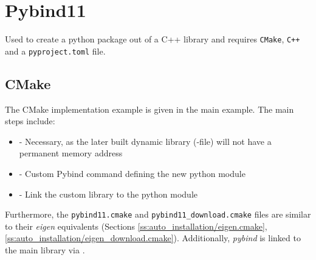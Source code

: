\vspace{2cm}
\section{Pybind11} \label{s:pybind11}
Used to create a python package out of a C++ library and requires \texttt{CMake}, \texttt{C++} and a \texttt{pyproject.toml} file.

\subsection{CMake}
The CMake implementation example is given in the main example. The main steps include:
\begin{itemize}
    \item {} - Necessary, as the later built dynamic library (-file) will not have a permanent memory address
    \item {} - Custom Pybind command defining the new python module
    \item {} - Link the custom library to the python module
\end{itemize}

Furthermore, the \texttt{pybind11.cmake} and \texttt{pybind11\_download.cmake} files are similar to their \textit{eigen} equivalents (Sections \ref{ss:auto_installation/eigen.cmake}, \ref{ss:auto_installation/eigen_download.cmake}).
Additionally, \textit{pybind} is linked to the main library via .

